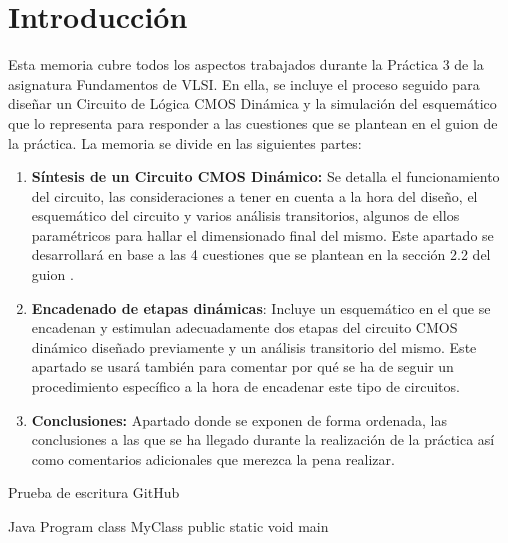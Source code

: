 
\renewcommand{\chaptername}{Sección}
\chapter{Introducción}

Esta memoria cubre todos los aspectos trabajados durante la Práctica 3 \cite{Guion} de la asignatura Fundamentos de VLSI. En ella, se incluye el proceso seguido para diseñar un Circuito de Lógica CMOS \cite{MOSFET} Dinámica y la simulación del esquemático que lo representa para responder a las cuestiones que se plantean en el guion de la práctica. La memoria se divide en las siguientes partes:

\begin{enumerate}
    \item \textbf{Síntesis de un Circuito CMOS Dinámico:} Se detalla el funcionamiento del circuito, las consideraciones a tener en cuenta a la hora del diseño, el esquemático del circuito y varios análisis transitorios, algunos de ellos paramétricos para hallar el dimensionado final del mismo. Este apartado se desarrollará en base a las 4 cuestiones que se plantean en la sección 2.2 del guion \cite{Guion}.
    \item \textbf{Encadenado de etapas dinámicas}: Incluye un esquemático en el que se encadenan y estimulan adecuadamente dos etapas del circuito CMOS dinámico diseñado previamente y un análisis transitorio del mismo. Este apartado se usará también para comentar por qué se ha de seguir un procedimiento específico a la hora de encadenar este tipo de circuitos.
    \item \textbf{Conclusiones:} Apartado donde se exponen de forma ordenada, las conclusiones a las que se ha llegado durante la realización de la práctica así como comentarios adicionales que merezca la pena realizar.
\end{enumerate}

Prueba de escritura GitHub

\begin{mylisting}{Java Program}
class MyClass
public static void main
\end{mylisting}
